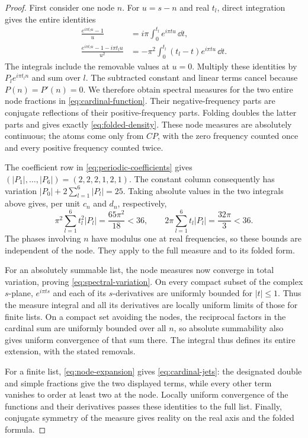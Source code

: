 \begin{proof}
First consider one node \(n\).  For \(u=s-n\) and real \(t_l\), direct
integration gives the entire identities
\begin{align*}
 \frac{e^{i\pi t_lu}-1}{u}
    &=i\pi\int_0^{t_l}e^{i\pi tu}\,\dd t,\\
 \frac{e^{i\pi t_lu}-1-i\pi t_lu}{u^2}
    &=-\pi^2\int_0^{t_l}(t_l-t)e^{i\pi tu}\,\dd t.
\end{align*}
The integrals include the removable values at \(u=0\).  Multiply these
identities by \(P_le^{i\pi t_ln}\) and sum over \(l\).  The subtracted
constant and linear terms cancel because \(P(n)=P'(n)=0\).  We therefore
obtain spectral measures for the two entire node fractions in
\eqref{eq:cardinal-function}.  Their negative-frequency parts are conjugate
reflections of their positive-frequency parts.  Folding doubles the latter
parts and gives exactly \eqref{eq:folded-density}.  These node measures are
absolutely continuous; the atoms come only from \(CP\), with the zero
frequency counted once and every positive frequency counted twice.

The coefficient row in \eqref{eq:periodic-coefficients} gives
\((|P_1|,\ldots,|P_6|)=(2,2,2,1,2,1)\).  The constant column consequently has
variation \(|P_0|+2\sum_{l=1}^6|P_l|=25\).  Taking absolute values in the two
integrals above gives, per unit \(c_n\) and \(d_n\), respectively,
\[
 \pi^2\sum_{l=1}^6t_l^2|P_l|=\frac{65\pi^2}{18}<36,
 \qquad
 2\pi\sum_{l=1}^6t_l|P_l|=\frac{32\pi}{3}<36.
\]
The phases involving \(n\) have modulus one at real frequencies, so these
bounds are independent of the node.  They apply to the full measure and to its
folded form.

For an absolutely summable list, the node measures now converge in total
variation, proving \eqref{eq:spectral-variation}.  On every compact subset
of the complex \(s\)-plane, \(e^{i\pi ts}\) and each of its \(s\)-derivatives
are uniformly bounded for \(|t|\le1\).  Thus the measure integral and all its
derivatives are locally uniform limits of those for finite lists.  On a
compact set avoiding the nodes, the reciprocal factors in the cardinal sum
are uniformly bounded over all \(n\), so absolute summability also gives
uniform convergence of that sum there.  The integral thus defines its entire
extension, with the stated removals.

For a finite list, \eqref{eq:node-expansion} gives
\eqref{eq:cardinal-jets}: the designated double and simple fractions give the
two displayed terms, while every other term vanishes to order at least two at
the node.  Locally uniform convergence of the functions and their derivatives
passes these identities to the full list.  Finally, conjugate symmetry of the
measure gives reality on the real axis and the folded formula.
\end{proof}


